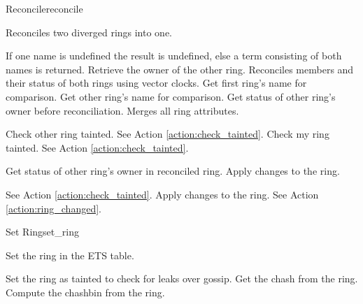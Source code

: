 \begin{actionbox}{Reconcile}{reconcile}
	\begin{action}
		 Reconciles two diverged rings into one.
		\begin{action}
			 If one name is undefined the result is undefined, else a term consisting of both names is returned.
			 Retrieve the owner of the other ring.
			 Reconciles members and their status of both rings using vector clocks.
			 Get first ring's name for comparison.
			 Get other ring's name for comparison.
			 Get status of other ring's owner before reconciliation.
			 Merges all ring attributes.
			\begin{action}
				 Check other ring tainted.
				See Action \ref{action:check_tainted}.
				 Check my ring tainted.
				See Action \ref{action:check_tainted}.
			\end{action}
			 Get status of other ring's owner in reconciled ring.
			 Apply changes to the ring.
			\begin{action}
				 See Action \ref{action:check_tainted}.
				 Apply changes to the ring.
				See Action \ref{action:ring_changed}.
			\end{action}
			\end{action}
	\end{action}
\end{actionbox}

\begin{actionbox}{Set Ring}{set_ring}
	\begin{action}
		 Set the ring in the ETS table.
		\begin{action}
			 Set the ring as tainted to check for leaks over gossip.
		 	 Get the chash from the ring.
		 	 Compute the chashbin from the ring.
		\end{action}
	\end{action}
\end{actionbox}


